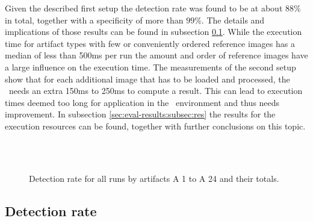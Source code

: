 Given the described first setup the detection rate was found to be at about $88\%$ in total, together with a specificity of more than $99\%$. The details and implications of those results can be found in subsection \ref{sec:eval-results:subsec:dect}. While the execution time for artifact types with few or conveniently ordered reference images has a median of less than 500ms per run the amount and order of reference images have a large influence on the execution time. The measurements of the second setup show that for each additional image that has to be loaded and processed, the \vd~needs an extra 150ms to 250ms to compute a result. This can lead to execution times deemed too long for application in the \ape~environment and thus needs improvement. In subsection \ref{sec:eval-results:subsec:res} the results for the execution resources can be found, together with further conclusions on this topic.

\begin{figure}[h!]
	\hfill\\
	\hfill\\
	\caption{Detection rate for all runs by artifacts A 1 to A 24 and their totals.}\label{fig:result-quality-sum}
\end{figure}

\subsection{Detection rate}\label{sec:eval-results:subsec:dect}

